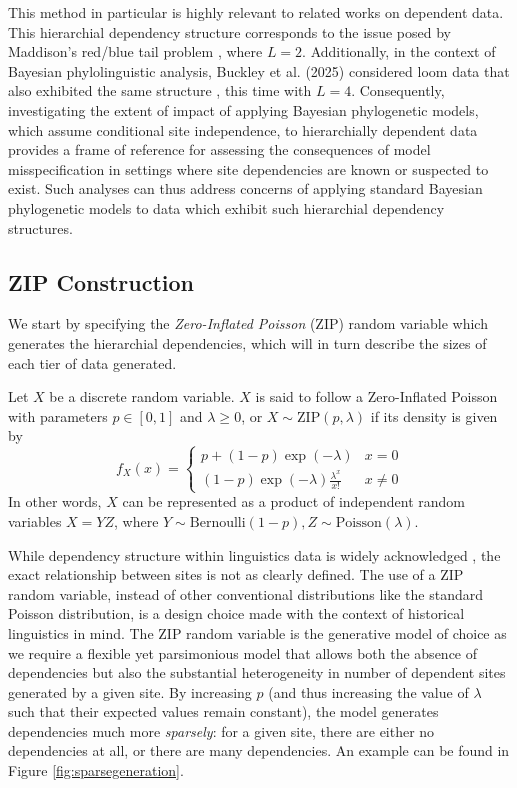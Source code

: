 This method in particular is highly relevant to related works on dependent data. This hierarchial dependency structure corresponds to the issue posed by Maddison's red/blue tail problem \cite{Maddison1993}, where $L = 2$. Additionally, in the context of Bayesian phylolinguistic analysis, Buckley et al. (2025) considered loom data that also exhibited the same structure \cite{Buckley2025}, this time with $L = 4$. Consequently, investigating the extent of impact of applying Bayesian phylogenetic models, which assume conditional site independence, to hierarchially dependent data provides a frame of reference for assessing the consequences of model misspecification in settings where site dependencies are known or suspected to exist. Such analyses can thus address concerns of applying standard Bayesian phylogenetic models to data which exhibit such hierarchial dependency structures.

\subsection{ZIP Construction}
\label{sec:zip}
We start by specifying the \textit{Zero-Inflated Poisson} (ZIP) random variable which generates the hierarchial dependencies, which will in turn describe the sizes of each tier of data generated. 

\begin{definition} 
    Let $X$ be a discrete random variable. $X$ is said to follow a Zero-Inflated Poisson with parameters $p \in [0, 1]$ and $\lambda \geq 0$, or $X \sim \text{ZIP}(p, \lambda)$ if its density is given by 
    \begin{equation}
    \label{eq:zip}
        f_X(x) = \begin{cases} p + (1-p)\exp(-\lambda) & x= 0 \\
        (1-p)\exp(-\lambda) \frac{\lambda^x}{x!} & x \neq 0
        \end{cases}
    \end{equation}
    In other words, $X$ can be represented as a product of independent random variables $X = YZ$, where $Y \sim \text{Bernoulli}(1 - p), Z \sim \text{Poisson}(\lambda)$.
\end{definition}

While dependency structure within linguistics data is widely acknowledged \cite{Longobardi2016}, the exact relationship between sites is not as clearly defined. The use of a ZIP random variable, instead of other conventional distributions like the standard Poisson distribution, is a design choice made with the context of historical linguistics in mind. The ZIP random variable is the generative model of choice as we require a flexible yet parsimonious model that allows both the absence of dependencies but also the substantial heterogeneity in number of dependent sites generated by a given site. By increasing $p$ (and thus increasing the value of $\lambda$ such that their expected values remain constant), the model generates dependencies much more \textit{sparsely}: for a given site, there are either no dependencies at all, or there are many dependencies. An example can be found in Figure \ref{fig:sparsegeneration}.

